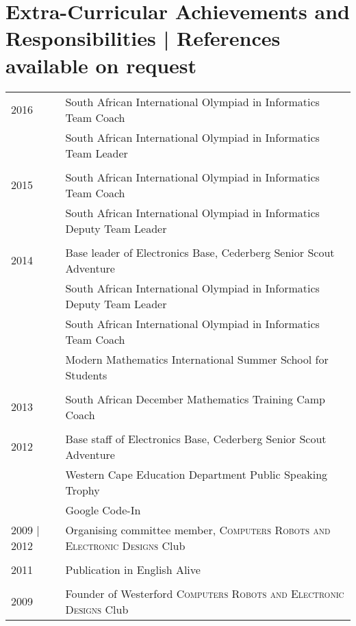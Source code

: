 \section{Extra-Curricular Achievements and Responsibilities \footnotesize | References available on request}

\begin{tabular}{R{3cm}|l}
2016 & South African International Olympiad in Informatics Team Coach\\
& South African International Olympiad in Informatics Team Leader\\
&\\
2015 & South African International Olympiad in Informatics Team Coach\\
& South African International Olympiad in Informatics Deputy Team Leader\\
&\\
2014 & Base leader of Electronics Base, Cederberg Senior Scout Adventure\\
& South African International Olympiad in Informatics Deputy Team Leader\\
& South African International Olympiad in Informatics Team Coach\\
& Modern Mathematics International Summer School for Students\\
&\\
2013 & South African December Mathematics Training Camp Coach\\
&\\
2012 & Base staff of Electronics Base, Cederberg Senior Scout Adventure\\
& Western Cape Education Department Public Speaking Trophy\\
&Google Code-In\\
2009 | 2012 & Organising committee member, \textsc{Computers Robots and Electronic Designs} Club\\
&\\
2011 & Publication in English Alive\\
&\\
2009 & Founder of Westerford \textsc{Computers Robots and Electronic Designs} Club\\
\end{tabular}

